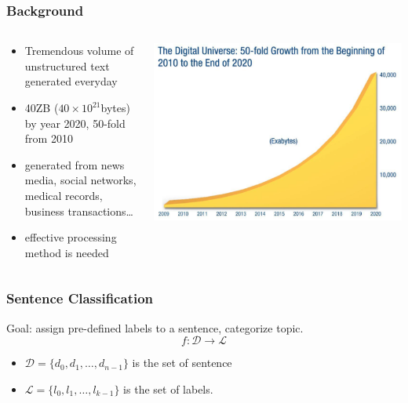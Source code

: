 \documentclass{beamer}
\begin{document}
\begin{frame}
\frametitle{Background}
    \begin{columns}
    \begin{column}{0.5\textwidth}
    \begin{itemize}
        \item Tremendous volume of unstructured text generated everyday
        \item 40ZB ($40\times 10^{21}$bytes) by year 2020, 50-fold from 2010\footnotemark
        \item generated from news media, social networks, medical records, 
            business transactions\ldots
        \item effective processing method is needed
    \end{itemize}
    \end{column}
    \begin{column}{0.5\textwidth}
    \center\includegraphics[width=\textwidth]{figure/data_growth_2020}
    \end{column}
    \end{columns}
\end{frame}

\begin{frame}
\frametitle{Sentence Classification}
    Goal: assign pre-defined labels to a sentence, categorize topic.
    $$f:\mathcal{D}\rightarrow\mathcal{L}$$
    \begin{itemize}
        \item $\mathcal{D}=\{d_0, d_1,\ldots, d_{n-1}\}$ is the set of sentence
        \item $\mathcal{L}=\{l_0, l_1,\ldots, l_{k-1}\}$ is the set of labels.
    \end{itemize}
\end{frame}
\end{document}
